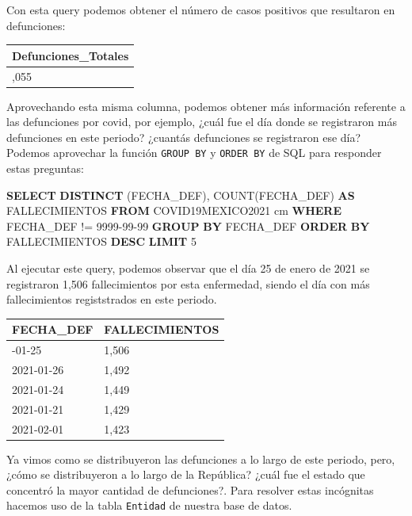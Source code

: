 \documentclass[11pt]{article}
\newenvironment{Shaded}{}{}
\newcommand{\KeywordTok}[1]{\textcolor[rgb]{0.00,0.44,0.13}{\textbf{{#1}}}}
\newcommand{\DecValTok}[1]{\textcolor[rgb]{0.25,0.63,0.44}{{#1}}}
\newcommand{\StringTok}[1]{\textcolor[rgb]{0.25,0.44,0.63}{{#1}}}
\newcommand{\FunctionTok}[1]{\textcolor[rgb]{0.02,0.16,0.49}{{#1}}}
\newcommand{\NormalTok}[1]{{#1}}
\newcommand{\OperatorTok}[1]{\textcolor[rgb]{0.40,0.40,0.40}{{#1}}}
\begin{document}
Con esta query podemos obtener el número de casos positivos que
resultaron en defunciones:

\begin{longtable}[]{@{}l@{}}
\toprule\noalign{}
Defunciones\_Totales \\
\midrule\noalign{}
\endhead
\bottomrule\noalign{}
\endlastfoot
180,055 \\
\end{longtable}

Aprovechando esta misma columna, podemos obtener más información
referente a las defunciones por covid, por ejemplo, ¿cuál fue el día
donde se registraron más defunciones en este periodo? ¿cuantás
defunciones se registraron ese día? Podemos aprovechar la función
\texttt{GROUP\ BY} y \texttt{ORDER\ BY} de SQL para responder estas
preguntas:

\begin{Shaded}
\begin{Highlighting}[]
\KeywordTok{SELECT} 
    \KeywordTok{DISTINCT}\NormalTok{ (FECHA\_DEF),}
    \FunctionTok{COUNT}\NormalTok{(FECHA\_DEF) }\KeywordTok{AS}\NormalTok{ FALLECIMIENTOS}
\KeywordTok{FROM} 
\NormalTok{    COVID19MEXICO2021 cm }
\KeywordTok{WHERE} 
\NormalTok{    FECHA\_DEF }\OperatorTok{!=} \StringTok{\textquotesingle{}9999{-}99{-}99\textquotesingle{}}
\KeywordTok{GROUP} \KeywordTok{BY} 
\NormalTok{    FECHA\_DEF}
\KeywordTok{ORDER} \KeywordTok{BY} 
\NormalTok{    FALLECIMIENTOS }\KeywordTok{DESC}
\KeywordTok{LIMIT} 
    \DecValTok{5}
\end{Highlighting}
\end{Shaded}

Al ejecutar este query, podemos observar que el día 25 de enero de 2021
se registraron 1,506 fallecimientos por esta enfermedad, siendo el día
con más fallecimientos registstrados en este periodo.

\begin{longtable}[]{@{}ll@{}}
\toprule\noalign{}
FECHA\_DEF & FALLECIMIENTOS \\
\midrule\noalign{}
\endhead
\bottomrule\noalign{}
\endlastfoot
2021-01-25 & 1,506 \\
2021-01-26 & 1,492 \\
2021-01-24 & 1,449 \\
2021-01-21 & 1,429 \\
2021-02-01 & 1,423 \\
\end{longtable}

Ya vimos como se distribuyeron las defunciones a lo largo de este
periodo, pero, ¿cómo se distribuyeron a lo largo de la República? ¿cuál
fue el estado que concentró la mayor cantidad de defunciones?. Para
resolver estas incógnitas hacemos uso de la tabla \texttt{Entidad} de
nuestra base de datos.
\end{document}

